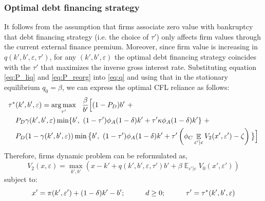 \documentclass[12pt]{article}
\DeclareMathOperator{\E}{\mathbb{E}}
\DeclareMathOperator*{\argmax}{arg\,max}
\begin{document}
\subsubsection{Optimal debt financing strategy}
It follows from the assumption that firms associate zero value with bankruptcy that debt financing strategy (i.e. the choice of $\tau'$) only affects firm values through the current external finance premium. Moreover, since firm value is increasing in $q(k',b',\varepsilon, \tau')$, for any $(k',b',\varepsilon)$ the optimal debt financing strategy coincides with the $\tau'$ that maximizes the inverse gross interest rate. Substituting equation \ref{eq:P_liq} and \ref{eq:P_reorg} into \ref{eq:q} and using that in the stationary equilibrium $q_0 = \beta$, we can express the optimal CFL reliance as follows:
\begin{equation} \label{eq:opt_tau}
    \begin{split}
        & \tau^*(k',b',\varepsilon) = \argmax_{\tau'} \ \  \frac{\beta}{b'} \Big{[} (1-P_D)b' \ +  \\
        & \quad  P_D \gamma(k',b',\varepsilon) \min\{b', \ (1-\tau') \phi_A (1-\delta) k' +\tau' \kappa \phi_A  (1-\delta) k' \} \ +  \\
        & \quad P_D (1-\gamma(k',b',\varepsilon))  \min\big{\{}b', \ (1-\tau') \phi_A (1-\delta) k' +\tau' \left( \phi_C \E_{\varepsilon'|\varepsilon}V_2 (x', \varepsilon') - \zeta \right) \big{\}} \Big{]} 
    \end{split}
 \end{equation}
Therefore, firms dynamic problem can be reformulated as, 
\begin{equation} \label{eq:V_2}
    V_2(x,\varepsilon) = \max_{k',b'} \left(x - k' +  q(k',b',\varepsilon, \tau')b' + \beta \E_{\varepsilon'|\varepsilon} V_0(x',\varepsilon') \right)
    \end{equation}
    subject to: 
    \begin{equation} \label{eq:cont_1}
    x' = \pi(k',\varepsilon')+(1-\delta)k'-b'; \hspace{10mm} d \geq 0;  \hspace{10mm} \tau' = \tau^*(k',b',\varepsilon)
    \end{equation}
    
\end{document}
